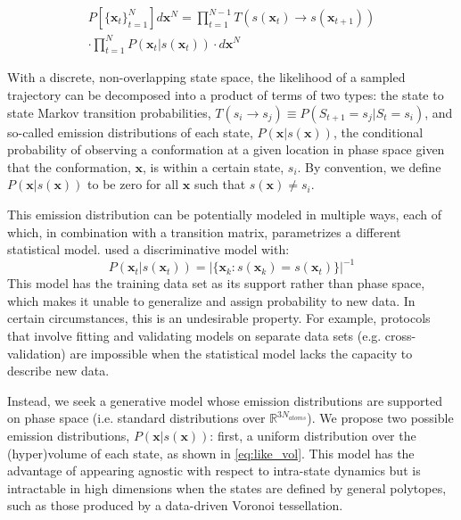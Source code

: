 \documentclass[journal=jpcbfk, layout=twocolumn, manuscript=article]{achemso}
\begin{document}
\begin{equation}
\begin{split}
P\left[\{\mathbf{x}_t\}_{t=1}^N\right] d\mathbf{x}^N = \prod_{t=1}^{N-1} T(s(\mathbf{x}_t) \rightarrow s(\mathbf{x}_{t+1})) \\
\cdot \prod_{t=1}^{N} P(\mathbf{x}_t | s(\mathbf{x}_t)) \cdot d\mathbf{x}^N
\label{eq:like}
\end{split}
\end{equation}

With a discrete, non-overlapping state space, the likelihood of a sampled trajectory can be decomposed into a product of terms of two types: the state to state Markov transition probabilities, $T(s_i \rightarrow s_j) \equiv P(S_{t+1}=s_j | S_{t}=s_i)$, and so-called emission distributions of each state, $P(\mathbf{x} | s(\mathbf{x}))$, the conditional probability of observing a conformation at a given location in phase space given that the conformation, $\mathbf{x}$, is within a certain state, $s_i$. By convention, we define $P(\mathbf{x}| s(\mathbf{x}))$ to be zero for all $\mathbf{x}$ such that $s(\mathbf{x}) \neq s_i$. 

This emission distribution can be potentially modeled in multiple ways, each of which, in combination with a transition matrix, parametrizes a different statistical model. \citet{Kellogg2012Evaluation} used a discriminative model with:
\begin{equation}
P(\mathbf{x}_t | s(\mathbf{x}_t)) = \big| \{ \mathbf{x}_k : s(\mathbf{x}_k) = s(\mathbf{x}_t) \} \big|^{-1}
\end{equation} This model has the training data set as its support rather than phase space, which makes it unable to generalize and assign probability to new data. In certain circumstances, this is an undesirable property. For example, protocols that involve fitting and validating models on separate data sets (e.g. cross-validation) are impossible when the statistical model lacks the capacity to describe new data.

Instead, we seek a generative model whose emission distributions are supported on phase space (i.e. standard distributions over $\mathbb{R}^{3N_{atoms}}$). We propose two possible emission distributions, $P(\mathbf{x} | s(\mathbf{x}))$: first, a uniform distribution over the (hyper)volume of each state, as shown in \cref{eq:like_vol}. This model has the advantage of appearing agnostic with respect to intra-state dynamics but is intractable in high dimensions when the states are defined by general polytopes, such as those produced by a data-driven Voronoi tessellation. 
 
\end{document}
